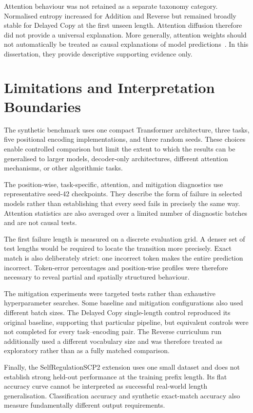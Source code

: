 \documentclass[
    author={Aanchala Ravindra Bhongade},
    supervisor={Dr. Fernando Moreno-Pino},
    degree={MSc},
    title={Length Generalisation in Transformer-Based Sequence Models: Failure Taxonomy and Mitigation Strategies},
    subtitle={},
    type={},
    year={2026}
]{dissertation}
\begin{document}
Attention behaviour was not retained as a separate taxonomy category. Normalised entropy increased for Addition and Reverse but remained broadly stable for Delayed Copy at the first unseen length. Attention diffusion therefore did not provide a universal explanation. More generally, attention weights should not automatically be treated as causal explanations of model predictions~\cite{jain2019attention}. In this dissertation, they provide descriptive supporting evidence only.

\section{Limitations and Interpretation Boundaries}
\label{sec:discussion-limitations}

The synthetic benchmark uses one compact Transformer architecture, three tasks, five positional encoding implementations, and three random seeds. These choices enable controlled comparison but limit the extent to which the results can be generalised to larger models, decoder-only architectures, different attention mechanisms, or other algorithmic tasks.

The position-wise, task-specific, attention, and mitigation diagnostics use representative seed-42 checkpoints. They describe the form of failure in selected models rather than establishing that every seed fails in precisely the same way. Attention statistics are also averaged over a limited number of diagnostic batches and are not causal tests.

The first failure length is measured on a discrete evaluation grid. A denser set of test lengths would be required to locate the transition more precisely. Exact match is also deliberately strict: one incorrect token makes the entire prediction incorrect. Token-error percentages and position-wise profiles were therefore necessary to reveal partial and spatially structured behaviour.

The mitigation experiments were targeted tests rather than exhaustive hyperparameter searches. Some baseline and mitigation configurations also used different batch sizes. The Delayed Copy single-length control reproduced its original baseline, supporting that particular pipeline, but equivalent controls were not completed for every task--encoding pair. The Reverse curriculum run additionally used a different vocabulary size and was therefore treated as exploratory rather than as a fully matched comparison.

Finally, the SelfRegulationSCP2 extension uses one small dataset and does not establish strong held-out performance at the training prefix length. Its flat accuracy curve cannot be interpreted as successful real-world length generalisation. Classification accuracy and synthetic exact-match accuracy also measure fundamentally different output requirements.
\end{document}
